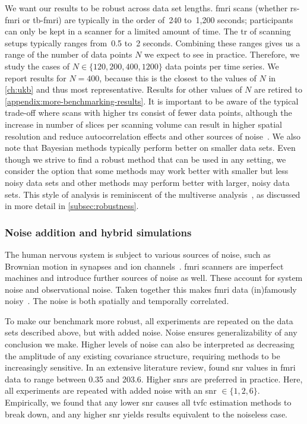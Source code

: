 We want our results to be robust across data set lengths.
\gls{fmri} scans (whether \gls{rs-fmri} or \gls{tb-fmri}) are typically in the order of~240 to~1,200 seconds; participants can only be kept in a scanner for a limited amount of time.
The \gls{tr} of scanning setups typically ranges from~0.5 to~2 seconds.
Combining these ranges gives us a range of the number of data points $N$ we expect to see in practice.
Therefore, we study the cases of $N \in \{120, 200, 400, 1200\}$ data points per time series.
We report results for $N = 400$, because this is the closest to the values of $N$ in \cref{ch:ukb} and thus most representative.
Results for other values of $N$ are retired to \cref{appendix:more-benchmarking-results}.
It is important to be aware of the typical trade-off where scans with higher \glspl{tr} consist of fewer data points, although the increase in number of slices per scanning volume can result in higher spatial resolution and reduce autocorrelation effects and other sources of noise~\parencite{Amaro2006, Iranpour2015, Yoo2018, McDowell2019}.
We also note that Bayesian methods typically perform better on smaller data sets.
Even though we strive to find a robust method that can be used in any setting, we consider the option that some methods may work better with smaller but less noisy data sets and other methods may perform better with larger, noisy data sets.
This style of analysis is reminiscent of the multiverse analysis~\parencite{Steegen2016}, as discussed in more detail in \cref{subsec:robustness}.

\subsubsection{Noise addition and hybrid simulations}

The human nervous system is subject to various sources of noise, such as Brownian motion in synapses and ion channels~\parencite{Faisal2008}.
\gls{fmri} scanners are imperfect machines and introduce further sources of noise as well.
These account for system noise and observational noise.
Taken together this makes \gls{fmri} data (in)famously noisy~\parencite[see also][for analysis and biophysical simulations of impact of noise and delay]{Deco2009}.
The noise is both spatially and temporally correlated.

To make our benchmark more robust, all experiments are repeated on the data sets described above, but with added noise.
Noise ensures generalizability of any conclusion we make.
Higher levels of noise can also be interpreted as decreasing the amplitude of any existing covariance structure, requiring methods to be increasingly sensitive.
In an extensive literature review, \textcite{Welvaert2013} found \gls{snr} values in \gls{fmri} data to range between 0.35 and 203.6.
Higher \glspl{snr} are preferred in practice.
%
Here, all experiments are repeated with added noise with an \gls{snr} $\in \{1, 2, 6\}$.
Empirically, we found that any lower \gls{snr} causes all \gls{tvfc} estimation methods to break down, and any higher \gls{snr} yields results equivalent to the noiseless case.

